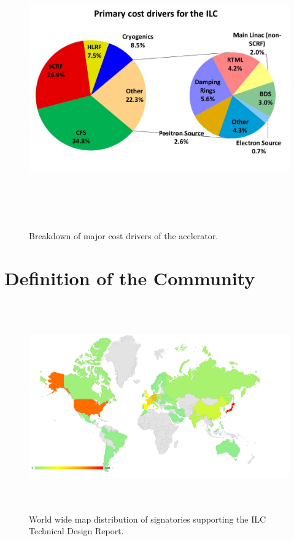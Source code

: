 \documentclass[%
 reprint,
 amsmath,amssymb,
 aps,
]{revtex4-1}
\begin{document}
\begin{figure}[h]
 \begin{center}
 \includegraphics[width=\hsize, height=12cm]{figures/AcceleratorCostDrivers.jpg}
\caption{Breakdown of major cost drivers of the acclerator. \label{AcceleratorCostDrivers}}
 \end{center}
 \end{figure}
\vspace*{5cm}
\newpage

\section{\label{Appendix2}Definition of the Community} 
\begin{figure}[h]
 \begin{center}
 \includegraphics[width=\hsize,height=9cm]{figures/WorldSignatoriesTDR.png}
\caption{World wide map distribution of signatories supporting the ILC Technical Design Report. \label{TDRsignatories}}
 \end{center}
 \end{figure}
 
\end{document}
